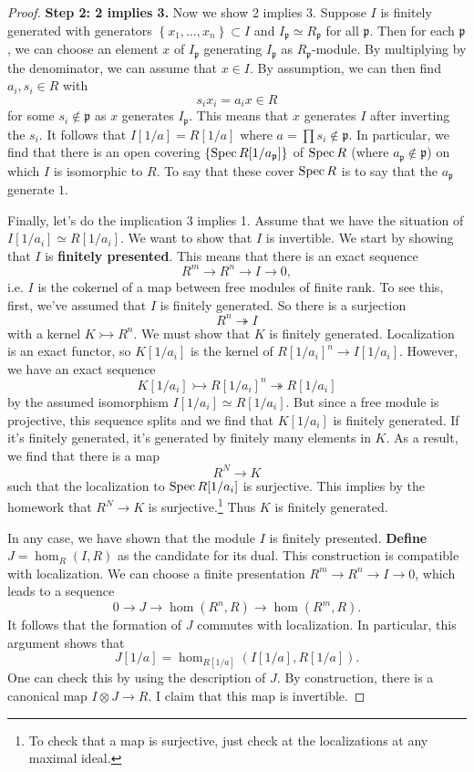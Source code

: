 \begin{proof}
\textbf{Step 2: 2 implies 3.}
Now we show 2 implies 3. Suppose $I$ is finitely generated with generators $\left\{x_1, \dots, x_n\right\} \subset I$ and $I_{\mathfrak{p}} \simeq
R_{\mathfrak{p}}$ for all $\mathfrak{p}$. Then for each $\mathfrak{p}
$, we can choose an element $x$ of $I_{\mathfrak{p}}$ generating
$I_{\mathfrak{p}}$ as $R_{\mathfrak{p}}$-module. 
By multiplying by the denominator, we can assume that $x \in I$. 
By assumption, we can then find $a_i,s_i \in R$ with
\[ s_i x_i = a_i x \in R  \]
for some $s_i \notin \mathfrak{p}$ as $x$ generates $I_{\mathfrak{p}}$. This means that $x$ generates $I$ after inverting the $s_i$. It
follows that $I[1/a] = R[1/a]$ where $a = \prod s_i \notin \mathfrak{p}$.
In particular, we find that there is an open covering $\{\operatorname{Spec}
R[1/a_{\mathfrak{p}}] \}$ of $\operatorname{Spec} R$ (where $a_{\mathfrak{p}} \notin
\mathfrak{p}$) on which $I$ is isomorphic to $R$. 
To say that these cover $\operatorname{Spec} R$ is to say that the $a_{\mathfrak{p}}$
generate $1$. 

Finally, let's do the implication 3 implies 1.  Assume that we have the
situation of $I[1/a_i] \simeq R[1/a_i]$. We want to show that $I$ is invertible. 
We start by showing that $I$ is \textbf{finitely presented}. This means that
there is an exact sequence
\[ R^m \to R^n \to I \to 0,  \]
i.e. $I$ is the cokernel of a map between free modules of finite rank.
To see this, first, we've assumed that $I$ is finitely generated. So there is a
surjection
\[ R^n \twoheadrightarrow I  \]
with a kernel $K \rightarrowtail  R^n$. We must show that $K$ is finitely
generated. Localization is an exact functor, so $K[1/a_i]$ is the kernel of
$R[1/a_i]^n \to I[1/a_i]$. However, we have an exact sequence
\[ K[1/a_i] \rightarrowtail  R[1/a_i]^n \twoheadrightarrow R[1/a_i]  \]
by the assumed isomorphism $I[1/a_i] \simeq R[1/a_i]$. But since a free module
is projective, this sequence splits and we find that $K[1/a_i]$ is finitely
generated. If it's finitely generated, it's generated by finitely many elements
in $K$. 
As a result, we find that there is a map
\[ R^N \to K  \]
such that the localization to $\operatorname{Spec} R[1/a_i]$ is surjective. This implies by
the homework that $R^N \to K$ is surjective.\footnote{To check that a map is
surjective, just check at the localizations at any maximal ideal.} Thus $K$ is finitely generated. 

In any case, we have shown that the module $I$ is finitely presented.
\textbf{Define} $J = \hom_R(I, R)$ as the candidate for its dual. This
construction is compatible with localization.
We can choose a finite presentation $R^m \to R^n \to I \to 0$, which leads to a
sequence
\[ 0 \to J \to \hom(R^n, R) \to \hom(R^m, R).  \]
It follows that the formation of $J$ commutes with localization. 
In particular, this argument shows that
\[ J[1/a] = \hom_{R[1/a]}(I[1/a], R[1/a]).  \]
One can check this by using the description of $J$. By construction, there is a
canonical map $I \otimes J \to R$. 
I claim that this map is invertible.


\end{proof}

